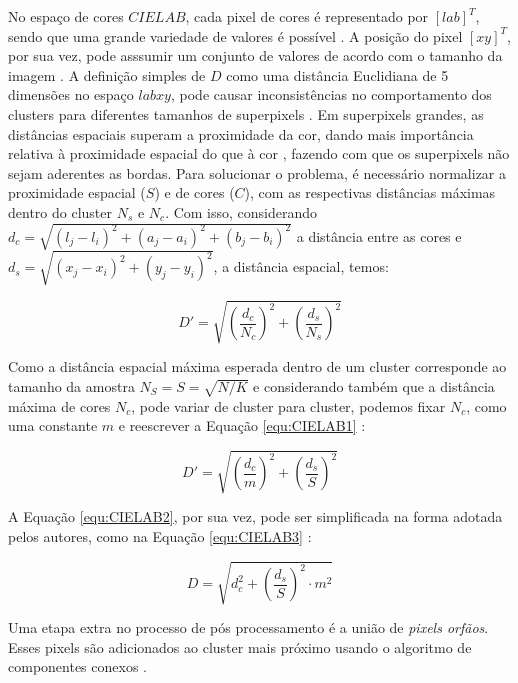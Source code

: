 \begin{document}
No espaço de cores $CIELAB$, cada pixel de cores é representado por $[l a b]^T$, sendo que uma grande variedade de valores é possível \cite{SLIC}. A posição do pixel $[x y]^T$, por sua vez, pode asssumir um conjunto de valores de acordo com o tamanho da imagem \cite{SLIC}. A definição simples de $D$ como uma distância Euclidiana de 5 dimensões no espaço $labxy$, pode causar inconsistências no comportamento dos clusters para diferentes tamanhos de superpixels \cite{SLIC}. Em superpixels grandes, as distâncias espaciais superam a proximidade da cor, dando mais importância relativa à proximidade espacial do que à cor \cite{SLIC}, fazendo com que os superpixels não sejam aderentes as bordas. Para solucionar o problema, é necessário normalizar a proximidade espacial ($S$) e de cores ($C$), com as respectivas distâncias máximas dentro do cluster $N_s$ e $N_c$. Com isso, considerando $d_c = \sqrt{(l_j - l_i)^2 + (a_j - a_i)^2 + (b_j - b_i)^2}$ a distância entre as cores e $d_s =  \sqrt{(x_j - x_i)^2 + (y_j - y_i)^2}$, a distância espacial, temos:

\begin{equation}
 D' = \sqrt{ \left(\frac{d_c}{N_c} \right)^2 + \left(\frac{d_s}{N_s} \right)^2}
 \label{equ:CIELAB1}
\end{equation}

Como a distância espacial máxima esperada dentro de um cluster corresponde ao tamanho da amostra $N_S = S = \sqrt{N/K}$ e considerando também que a distância máxima de cores $N_c$, pode variar de cluster para cluster, podemos fixar $N_c$, como uma constante $m$ e reescrever a Equação \ref{equ:CIELAB1} \cite{SLIC}:

\begin{equation}
 D' = \sqrt{ \left(\frac{d_c}{m} \right)^2 + \left(\frac{d_s}{S} \right)^2}
 \label{equ:CIELAB2}
\end{equation}

A Equação \ref{equ:CIELAB2}, por sua vez, pode ser simplificada na forma adotada pelos autores, como na Equação \ref{equ:CIELAB3} \cite{SLIC}:

\begin{equation}
 D = \sqrt{d_c^2 + \left(\frac{d_s}{S} \right)^2 \cdot m^2}
 \label{equ:CIELAB3}
\end{equation}

Uma etapa extra no processo de pós processamento é a união de \textit{pixels orfãos}. Esses pixels são adicionados ao cluster mais próximo usando o algoritmo de componentes conexos \cite{SLIC}.
\end{document}
